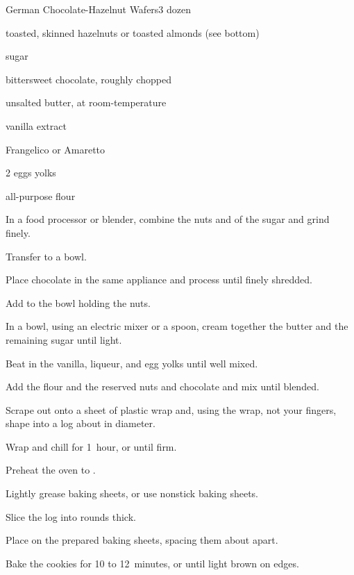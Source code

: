 \begin{recipe}{German Chocolate-Hazelnut Wafers}{}{3 dozen}

\begin{ingredients}
\item {} toasted, skinned hazelnuts or toasted almonds (see bottom)
\item \C{\third} sugar
\item {} bittersweet chocolate, roughly chopped
\item \C{\half} unsalted butter, at room-temperature
\item {} vanilla extract
\item {} Frangelico or Amaretto
\item 2 eggs yolks
\item {} all-purpose flour
\end{ingredients}

\begin{directions}
\item In a food processor or blender, combine the nuts and  of the sugar and grind finely.
\item Transfer to a bowl.
\item Place chocolate in the same appliance and process until finely shredded.
\item Add to the bowl holding the nuts.
\item In a bowl, using an electric mixer or a spoon, cream together the butter and the remaining sugar until light.
\item Beat in the vanilla, liqueur, and egg yolks until well mixed.
\item Add the flour and the reserved nuts and chocolate and mix until blended.
\item Scrape out onto a sheet of plastic wrap and, using the wrap, not your fingers, shape into a log about \inch{2\quarter} in diameter.
\item Wrap and chill for 1~hour, or until firm.
\item Preheat the oven to .
\item Lightly grease baking sheets, or use nonstick baking sheets.
\item Slice the log into rounds \cm{\half} thick.
\item Place on the prepared baking sheets, spacing them about \cm{1\half} apart.
\item Bake the cookies for 10 to 12~minutes, or until light brown on edges.
\end{directions}

\end{recipe}
